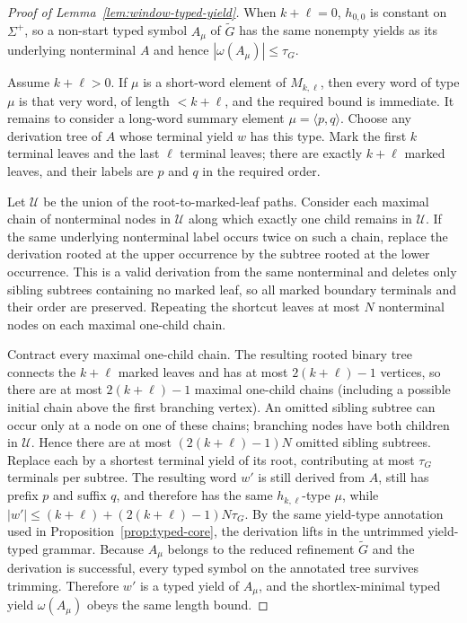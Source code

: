 \documentclass[11pt,a4paper]{article}
\theoremstyle{remark}
\theoremstyle{plain}
\begin{document}
\begin{proof}[Proof of Lemma~\ref{lem:window-typed-yield}]
When $k+\ell=0$, $h_{0,0}$ is constant on $\Sigma^+$, so a non-start typed
symbol $A_\mu$ of $\widetilde G$ has the same nonempty yields as its
underlying nonterminal $A$ and hence $|\omega(A_\mu)|\le\tau_G$.

Assume $k+\ell>0$.  If $\mu$ is a short-word
element of $M_{k,\ell}$, then every word of type $\mu$ is that very word, of
length $<k+\ell$, and the required bound is immediate.  It remains to consider a
long-word summary element $\mu=\langle p,q\rangle$.  Choose any derivation
tree of $A$ whose terminal yield $w$ has this type.  Mark the first $k$
terminal leaves and the last $\ell$ terminal leaves; there are exactly
$k+\ell$ marked leaves, and their labels are $p$ and $q$ in the required order.

Let $\mathcal U$ be the union of the root-to-marked-leaf paths.  Consider each
maximal chain of nonterminal nodes in $\mathcal U$ along which exactly one child
remains in $\mathcal U$.  If the same underlying nonterminal label occurs twice on
such a chain, replace the derivation rooted at the upper occurrence by the
subtree rooted at the lower occurrence.  This is a valid derivation from the
same nonterminal and deletes only sibling subtrees containing no marked leaf,
so all marked boundary terminals and their order are preserved.  Repeating
the shortcut leaves at most $N$ nonterminal nodes on each maximal one-child
chain.

Contract every maximal one-child chain.  The resulting rooted binary tree
connects the $k+\ell$ marked leaves and has at most $2(k+\ell)-1$ vertices,
so there are at most $2(k+\ell)-1$ maximal one-child chains (including a possible initial chain
above the first branching vertex).  An omitted sibling subtree can occur only
at a node on one of these chains; branching nodes have both children in
$\mathcal U$.  Hence there are at most $(2(k+\ell)-1)N$ omitted sibling subtrees.  Replace
each by a shortest terminal yield of its root, contributing at most $\tau_G$
terminals per subtree.  The resulting word $w'$ is still derived from $A$,
still has prefix $p$ and suffix $q$, and therefore has the same
$h_{k,\ell}$-type $\mu$, while
$|w'|\le (k+\ell)+(2(k+\ell)-1)N\tau_G$.
By the same yield-type annotation used in
Proposition~\ref{prop:typed-core}, the derivation lifts in the untrimmed
yield-typed grammar.  Because $A_\mu$ belongs to the reduced refinement
$\widetilde G$ and the derivation is successful, every typed symbol on the
annotated tree survives trimming.  Therefore $w'$ is
a typed yield of $A_\mu$, and the shortlex-minimal typed yield $\omega(A_\mu)$ obeys
the same length bound.
\end{proof}
\end{document}
